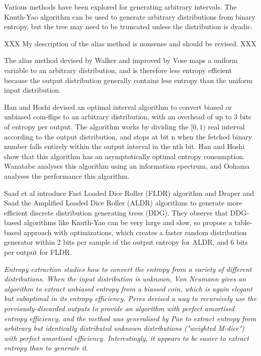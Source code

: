 \documentclass[12pt]{article}
\begin{document}
Various methods have been explored for generating arbitrary intervals.
The Knuth-Yao algorithm can be used to generate arbitrary distributions from binary entropy, but the tree may need to be truncated unless the distribution is dyadic.

XXX My description of the alias method is nonsense and should be revised. XXX

The alias method devised by Walker \cite{walker1977efficient} and improved by Vose \cite{vose91} maps a uniform variable to an arbitrary distribution, and is therefore less entropy efficient because the output distribution generally contains less entropy than the uniform input distribution.

Han and Hoshi \cite{han97} devised an optimal interval algorithm to convert biased or unbiased coin-flips to an arbitrary distribution, with an overhead of up to 3 bits of entropy per output.  The algorithm works by dividing the $[0,1)$ real interval according to the output distribution, and stops at bit n when the fetched binary number falls entirely within the output interval in the nth bit. Han and Hoshi show that this algorithm has an asymptotically optimal entropy consumption. 
Wanatabe \cite{wanatabe20} analyses this algorithm using an information spectrum, and Oohama \cite{oohama11, oohama2020performance} analyses the performance this algorithm.

Saad et al \cite{saad2020fldr} introduce Fast Loaded Dice Roller (FLDR) algorithm and Draper and Saad \cite{draper2025efficient} the Amplified Loaded Dice Roller (ALDR) algorithms to generate more efficient discrete distribution generating trees (DDG). They observe that DDG-based algorithms like Knuth-Yao can be very large and slow, so propose a table-based approach with optimizations, which creates a faster random distribution generator within 2 bits per sample of the output entropy for ALDR, and 6 bits per output for FLDR.

\em Entropy extraction \em studies how to convert the entropy \em from \em a variety of different distributions. When the input distribution is unknown, Von Neumann \cite{neumann51} gives an algorithm to extract unbiased entropy from a biassed coin, which is again elegant but suboptimal in its entropy efficiency. Peres \cite{peres1992iterating} devised a way to recursively use the previously-discarded outputs to provide an algorithm with perfect amortised entropy efficiency, and the method was generalised by Pae \cite{pae15} to extract entropy from arbitrary but identically distributed unknown distributions ("weighted M-dice") with perfect amortised efficiency. Interestingly, it appears to be easier to extract entropy than to generate it.
\end{document}
